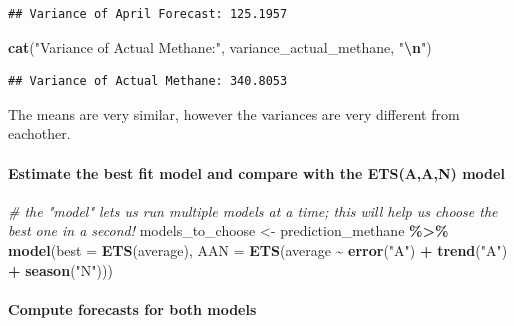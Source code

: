 \documentclass[
]{article}
\newenvironment{Shaded}{\begin{snugshade}}{\end{snugshade}}
\newcommand{\AttributeTok}[1]{\textcolor[rgb]{0.13,0.29,0.53}{#1}}
\newcommand{\CommentTok}[1]{\textcolor[rgb]{0.56,0.35,0.01}{\textit{#1}}}
\newcommand{\FunctionTok}[1]{\textcolor[rgb]{0.13,0.29,0.53}{\textbf{#1}}}
\newcommand{\NormalTok}[1]{#1}
\newcommand{\OtherTok}[1]{\textcolor[rgb]{0.56,0.35,0.01}{#1}}
\newcommand{\SpecialCharTok}[1]{\textcolor[rgb]{0.81,0.36,0.00}{\textbf{#1}}}
\newcommand{\StringTok}[1]{\textcolor[rgb]{0.31,0.60,0.02}{#1}}
\begin{document}
\begin{verbatim}
## Variance of April Forecast: 125.1957
\end{verbatim}

\begin{Shaded}
\begin{Highlighting}[]
\FunctionTok{cat}\NormalTok{(}\StringTok{"Variance of Actual Methane:"}\NormalTok{, variance\_actual\_methane, }\StringTok{"}\SpecialCharTok{\textbackslash{}n}\StringTok{"}\NormalTok{)}
\end{Highlighting}
\end{Shaded}

\begin{verbatim}
## Variance of Actual Methane: 340.8053
\end{verbatim}

The means are very similar, however the variances are very different
from eachother.

\hypertarget{estimate-the-best-fit-model-and-compare-with-the-etsaan-model}{%
\paragraph{Estimate the best fit model and compare with the ETS(A,A,N)
model}\label{estimate-the-best-fit-model-and-compare-with-the-etsaan-model}}

\begin{Shaded}
\begin{Highlighting}[]
\CommentTok{\# the "model" lets us run multiple models at a time; this will help us choose the best one in a second!}
\NormalTok{models\_to\_choose }\OtherTok{\textless{}{-}}\NormalTok{ prediction\_methane }\SpecialCharTok{\%\textgreater{}\%}
  \FunctionTok{model}\NormalTok{(}\AttributeTok{best =} \FunctionTok{ETS}\NormalTok{(average),}
        \AttributeTok{AAN =} \FunctionTok{ETS}\NormalTok{(average }\SpecialCharTok{\textasciitilde{}} \FunctionTok{error}\NormalTok{(}\StringTok{"A"}\NormalTok{) }\SpecialCharTok{+} \FunctionTok{trend}\NormalTok{(}\StringTok{"A"}\NormalTok{) }\SpecialCharTok{+} \FunctionTok{season}\NormalTok{(}\StringTok{"N"}\NormalTok{))) }
\end{Highlighting}
\end{Shaded}

\hypertarget{compute-forecasts-for-both-models}{%
\paragraph{Compute forecasts for both
models}\label{compute-forecasts-for-both-models}}
\end{document}
